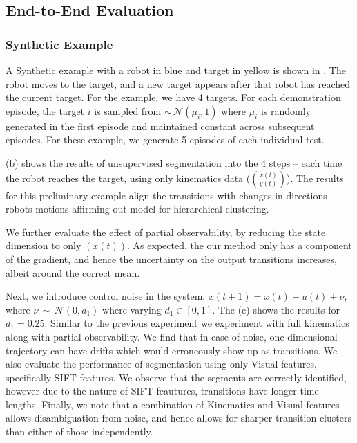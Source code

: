 \subsection{End-to-End Evaluation}

\subsubsection{Synthetic Example}
A Synthetic example with a robot in blue and target in yellow is shown in . The robot moves to the target, and a new target appears after that robot has reached the current target. For the example, we have 4 targets. For each demonstration episode, the target $i$ is sampled from  $\sim\,\mathcal{N}(\mu_i, 1)$ where $\mu_i$ is randomly generated in the first episode and maintained constant across subsequent episodes. For these example, we generate 5 episodes of each individual test.

 (b) shows the results of unsupervised segmentation into the 4 steps -- each time the robot reaches the target, using only kinematics data ($\binom{x(t)}{y(t)}$). The results for this preliminary example align the transitions with changes in directions robots motions affirming out model for hierarchical clustering. 

We further evaluate the effect of partial observability, by reducing the state dimension to only $(x(t))$. As expected, the our method only has a component of the gradient, and hence the uncertainty on the output transitions increases, albeit around the correct mean. 

Next, we introduce control noise in the system, $x(t+1) = x(t)+u(t)+\nu$, where $\nu\, \sim\, \mathcal{N}(0, d_1)$ where varying $d_1\in[0,1]$. The  (c) shows the results for $d_1=0.25$. Similar to the previous experiment we experiment with full kinematics along with partial observability. We find that in case of noise, one dimensional trajectory can have drifts which would erroneously show up as transitions. 
We also evaluate the performance of segmentation using only Visual features, specifically SIFT features. We observe that the segments are correctly identified, however due to the nature of SIFT feautures, transitions have longer time lengths.
Finally, we note that a combination of Kinematics and Visual features allows disambiguation from noise, and hence allows for sharper transition clusters than either of those independently. 


